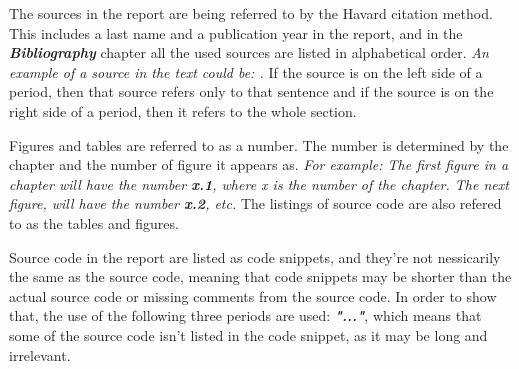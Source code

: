 The sources in the report are being referred to by the Havard citation method. This includes a last name and a publication year in the report, and in the \textit{\textbf{Bibliography}} chapter all the used sources are listed in alphabetical order. \newline
\textit{An example of a source in the text could be: \textbf{\citep{Sebesta}}.}
\newline
If the source is on the left side of a period, then that source refers only to that sentence and if the source is on the right side of a period, then it refers to the whole section. 

Figures and tables are referred to as a number. The number is determined by the chapter and the number of figure it appears as. \newline
\textit{For example: The first figure in a chapter will have the number \textbf{x.1}, where x is the number of the chapter. The next figure, will have the number \textbf{x.2}, etc.}
\newline
The listings of source code are also refered to as the tables and figures. 

Source code in the report are listed as code snippets, and they're not nessicarily the same as the source code, meaning that code snippets may be shorter than the actual source code or missing comments from the source code. In order to show that, the use of the following three periods are used: \textit\textbf{{"..."}}, which means that some of the source code isn't listed in the code snippet, as it may be long and irrelevant. 

